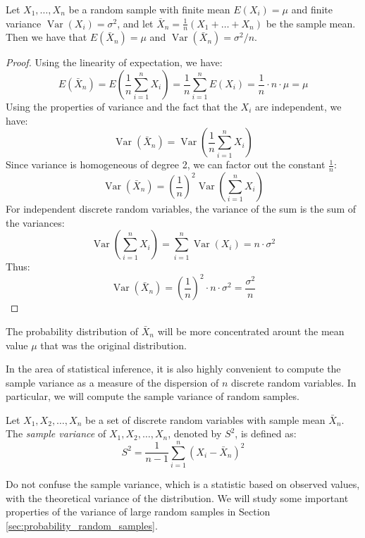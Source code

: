 \begin{proposition}\label{prop:sample_mean}
Let \( X_1, \ldots, X_n \) be a random sample with finite mean \( E\left( X_i \right) = \mu \) and finite variance \( \operatorname{Var}\left( X_i \right) = \sigma^2 \), and let \( \bar{X}_n = \frac{1}{n} \left( X_1 + \ldots + X_n \right) \) be the sample mean. Then we have that \( E\left( \bar{X}_n \right) = \mu \) and \( \operatorname{Var}\left( \bar{X}_n \right) = \sigma^2 / n \).
\end{proposition}
\begin{proof}
Using the linearity of expectation, we have:
\[
E\left( \bar{X}_n \right) = E\left( \frac{1}{n} \sum_{i=1}^{n} X_i \right) = \frac{1}{n} \sum_{i=1}^{n} E\left( X_i \right) = \frac{1}{n} \cdot n \cdot \mu = \mu
\]
Using the properties of variance and the fact that the \( X_i \) are independent, we have:
\[
\operatorname{Var}\left( \bar{X}_n \right) = \operatorname{Var}\left( \frac{1}{n} \sum_{i=1}^{n} X_i \right)
\]
Since variance is homogeneous of degree 2, we can factor out the constant \( \frac{1}{n} \):
\[
\operatorname{Var}\left( \bar{X}_n \right) = \left( \frac{1}{n} \right)^2 \operatorname{Var}\left( \sum_{i=1}^{n} X_i \right)
\]
For independent discrete random variables, the variance of the sum is the sum of the variances:
\[
\operatorname{Var}\left( \sum_{i=1}^{n} X_i \right) = \sum_{i=1}^{n} \operatorname{Var}\left( X_i \right) = n \cdot \sigma^2
\]
Thus:
\[
\operatorname{Var}\left( \bar{X}_n \right) = \left( \frac{1}{n} \right)^2 \cdot n \cdot \sigma^2 = \frac{\sigma^2}{n}
\]
\end{proof}

The probability distribution of $\bar{X}_n$ will be more concentrated arount the mean value $\mu$ that was the original distribution. 

In the area of statistical inference, it is also highly convenient to compute the sample variance as a measure of the dispersion of \( n \) discrete random variables. In particular, we will compute the sample variance of random samples.

\begin{definition}
Let \( X_1, X_2, \ldots, X_n \) be a set of discrete random variables with sample mean \( \bar{X}_n \). The \emph{sample variance} of \( X_1, X_2, \ldots, X_n \), denoted by \( S^2 \), is defined as:
\[
S^2 = \frac{1}{n - 1} \sum_{i=1}^n \left( X_i - \bar{X}_n \right)^2
\]
\end{definition}

Do not confuse the sample variance, which is a statistic based on observed values, with the theoretical variance of the distribution. We will study some important properties of the variance of large random samples in Section \ref{sec:probability_random_samples}.

